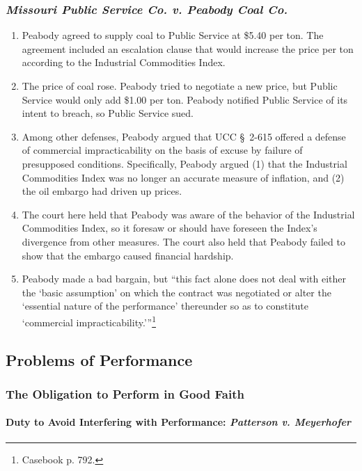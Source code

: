 \subsubsection{\emph{Missouri Public Service Co. v. Peabody Coal Co.}}

\begin{enumerate}
    \item Peabody agreed to supply coal to Public Service at \$5.40 per ton. 
    The agreement included an escalation clause that would increase the price 
    per ton according to the Industrial Commodities Index.
    \item The price of coal rose. Peabody tried to negotiate a new price, but 
    Public Service would only add \$1.00 per ton. Peabody notified Public 
    Service of its intent to breach, so Public Service sued.
    \item Among other defenses, Peabody argued that UCC \S\ 2-615 offered a 
    defense of commercial impracticability on the basis of excuse by failure 
    of presupposed conditions. Specifically, Peabody argued (1) that the 
    Industrial Commodities Index was no longer an accurate measure of 
    inflation, and (2) the oil embargo had driven up prices.
    \item The court here held that Peabody was aware of the behavior of the 
    Industrial Commodities Index, so it foresaw or should have foreseen the 
    Index's divergence from other measures. The court also held that Peabody 
    failed to show that the embargo caused financial hardship.
    \item Peabody made a bad bargain, but \enquote{this fact alone does not 
    deal with either the `basic assumption' on which the contract was 
    negotiated or alter the `essential nature of the performance' thereunder 
    so as to constitute `commercial impracticability.'}\footnote{Casebook p. 
    792.}
\end{enumerate}

\subsection{Problems of Performance}

\subsubsection{The Obligation to Perform in Good Faith}

\paragraph{Duty to Avoid Interfering with Performance: \emph{Patterson v. 
Meyerhofer}}

